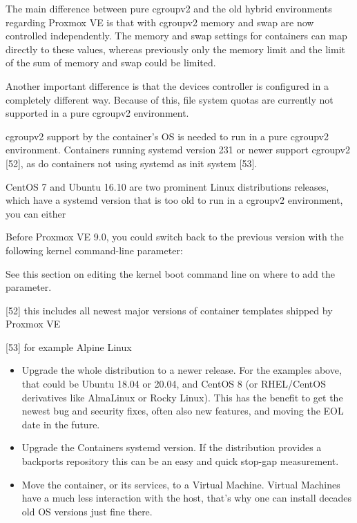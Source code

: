 The main difference between pure cgroupv2 and the old hybrid environments regarding Proxmox VE is that with cgroupv2 memory and swap are now controlled independently. The memory and swap settings for containers can map directly to these values, whereas previously only the memory limit and the limit of the sum of memory and swap could be limited.

Another important difference is that the devices controller is configured in a completely different way. Because of this, file system quotas are currently not supported in a pure cgroupv2 environment.

cgroupv2 support by the container’s OS is needed to run in a pure cgroupv2 environment. Containers running systemd version 231 or newer support cgroupv2 [52], as do containers not using systemd as init system [53].

CentOS 7 and Ubuntu 16.10 are two prominent Linux distributions releases, which have a systemd version that is too old to run in a cgroupv2 environment, you can either

Before Proxmox VE 9.0, you could switch back to the previous version with the following kernel command-line parameter:

See this section on editing the kernel boot command line on where to add the parameter.

[52] this includes all newest major versions of container templates shipped by Proxmox VE

[53] for example Alpine Linux

\begin{itemize}[leftmargin=2cm]

	\item Upgrade the whole distribution to a newer release. For the examples above, that could be Ubuntu 18.04 or 20.04, and CentOS 8 (or RHEL/CentOS derivatives like AlmaLinux or Rocky Linux). This has the benefit to get the newest bug and security fixes, often also new features, and moving the EOL date in the future.

	\item Upgrade the Containers systemd version. If the distribution provides a backports repository this can be an easy and quick stop-gap measurement.

	\item Move the container, or its services, to a Virtual Machine. Virtual Machines have a much less interaction with the host, that’s why one can install decades old OS versions just fine there.

\end{itemize}

